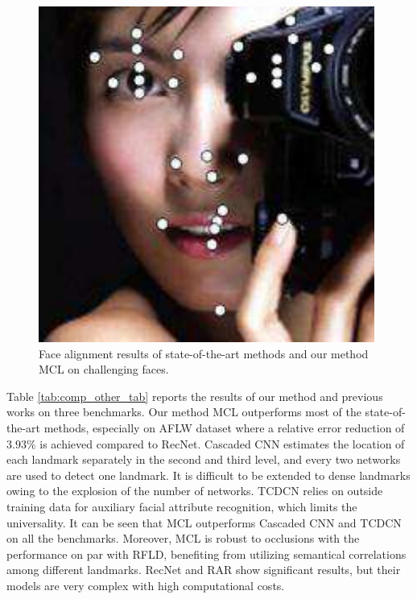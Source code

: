 \documentclass[journal]{IEEEtran}
\begin{document}
\begin{figure}[!htb]
{\begin{minipage}[b]{0.38\textwidth}
\includegraphics[scale=0.22]{29_RCPR_115}
\end{minipage}
}
\caption{Face alignment results of state-of-the-art methods and our method MCL on challenging faces.}
\label{fig:compare results}
\end{figure}

Table \ref{tab:comp_other_tab} reports the results of our method and previous works on three benchmarks. Our method MCL outperforms most of the state-of-the-art methods, especially on AFLW dataset where a relative error reduction of $3.93\%$ is achieved compared to RecNet. Cascaded CNN estimates the location of each landmark separately in the second and third level, and every two networks are used to detect one landmark. It is difficult to be extended to dense landmarks owing to the explosion of the number of networks. TCDCN relies on outside training data for auxiliary facial attribute recognition, which limits the universality. It can be seen that MCL outperforms Cascaded CNN and TCDCN on all the benchmarks. Moreover, MCL is robust to occlusions with the performance on par with RFLD, benefiting from utilizing semantical correlations among different landmarks. RecNet and RAR show significant results, but their models are very complex with high computational costs.
\end{document}
